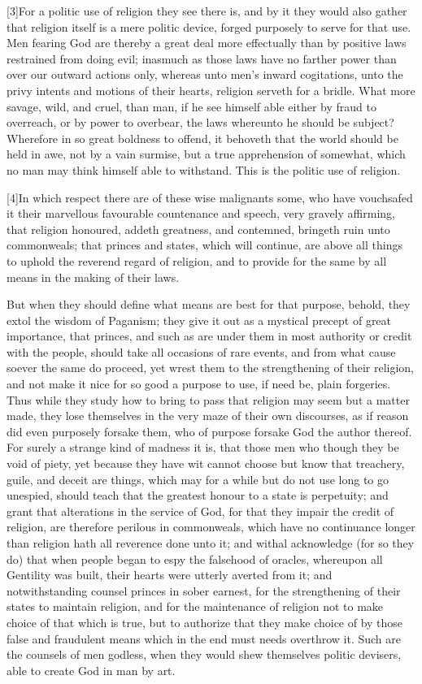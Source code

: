 [3]For a politic use of religion they see there is, and by it they would also gather that religion itself is a mere politic device, forged purposely to serve for that use. Men  fearing God are thereby a great deal more effectually than by positive laws restrained from doing evil;
 inasmuch as those laws have no farther power than over our outward actions only, whereas unto men’s inward cogitations, unto the privy intents and motions of their hearts, religion serveth for a bridle. What more savage, wild, and cruel, than man, if he see himself able either by fraud to overreach, or by power to overbear, the laws whereunto he should be subject? Wherefore in so great boldness to offend, it behoveth that the world should be held in awe, not by a vain surmise, but a true apprehension of somewhat, which no man may think himself able to withstand. This is the politic use of religion.

[4]In which respect there are of these wise malignants some, who have vouchsafed it their marvellous favourable countenance and speech, very gravely affirming, that religion honoured, addeth greatness, and contemned, bringeth ruin unto commonweals; that princes and states, which will continue, are above all things to uphold the reverend regard of religion, and to provide for the same by all means in the making of their laws.

But when they should define what means are best for that purpose, behold, they extol the wisdom of Paganism; they give it out as a mystical precept of great importance, that princes, and such as are under them in most authority or credit with the people, should take all occasions of rare events, and from what cause soever the same do proceed, yet wrest  them to the strengthening of their religion, and not make it nice for so good a purpose to use, if need be, plain forgeries.
 Thus while they study how to bring to pass that religion may seem but a matter made, they lose themselves in the very maze of their own discourses, as if reason did even purposely forsake them, who of purpose forsake God the author thereof. For surely a strange kind of madness it is, that those men who though they be void of piety, yet because they have wit cannot choose but know that treachery, guile, and deceit are things, which may for a while but do not use long to go unespied, should teach that the greatest honour to a state is perpetuity; and grant that alterations in the service of God, for that they impair the credit of religion, are therefore perilous in commonweals, which have no continuance longer than religion hath all reverence done unto it; and withal acknowledge (for so they do) that when people began to espy the falsehood of oracles, whereupon all Gentility was built, their hearts were utterly averted from it; and notwithstanding counsel princes in sober earnest, for the strengthening of their states to maintain religion, and for the maintenance of religion not to make choice of that which is true, but to authorize that they make choice of by those false and fraudulent means which in the end must needs overthrow it. Such are the counsels of men godless, when they would shew themselves politic devisers, able to create God in man by art.


